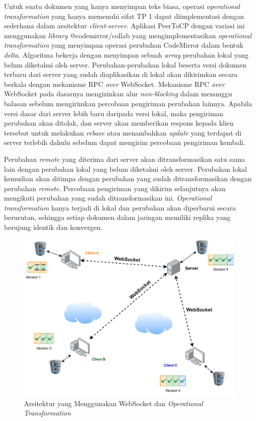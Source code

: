 Untuk suatu dokumen yang hanya menyimpan teks biasa, operasi \textit{operational transformation} yang hanya memenuhi sifat TP 1 dapat diimplementasi dengan sederhana dalam arsitektur \textit{client-server}. Aplikasi PeerToCP dengan variasi ini menggunakan \textit{library} @codemirror/collab yang mengimplementasikan \textit{operational transformation} yang menyimpan operasi perubahan CodeMirror dalam bentuk \textit{delta}. Algoritma bekerja dengan menyimpan sebuah \textit{array} perubahan lokal yang belum diketahui oleh server. Perubahan-perubahan lokal beserta versi dokumen terbaru dari server yang sudah diaplikasikan di lokal akan dikirimkan secara berkala dengan mekanisme RPC \textit{over} WebSocket. Mekanisme RPC \textit{over} WebSocket pada dasarnya mengizinkan alur \textit{non-blocking} dalam menunggu balasan sebelum mengirimkan percobaan pengiriman perubahan lainnya. Apabila versi dasar dari server lebih baru daripada versi lokal, maka pengiriman perubahan akan ditolak, dan server akan memberikan respons kepada klien tersebut untuk melakukan \textit{rebase} atau menambahkan \textit{update} yang terdapat di server terlebih dahulu sebelum dapat mengirim percobaan pengiriman kembali.

Perubahan \textit{remote} yang diterima dari server akan ditransformasikan satu sama lain dengan perubahan lokal yang belum diketahui oleh server. Perubahan lokal kemudian akan ditimpa dengan perubahan yang sudah ditransformasikan dengan perubahan \textit{remote}. Percobaan pengiriman yang dikirim selanjutnya akan mengikuti perubahan yang sudah ditransformasikan ini. \textit{Operational transformation} hanya terjadi di lokal dan perubahan akan diperbarui secara berurutan, sehingga setiap dokumen dalam jaringan memiliki replika yang berujung identik dan konvergen.


\begin{figure}
    \centering
    \includegraphics[scale=0.65]{assets/skripsi/Arsitektur_WebSocket_OT}
    \caption{Arsitektur yang Menggunakan WebSocket dan \textit{Operational Transformation}}
    \label{fig:websocket_ot}
\end{figure}

